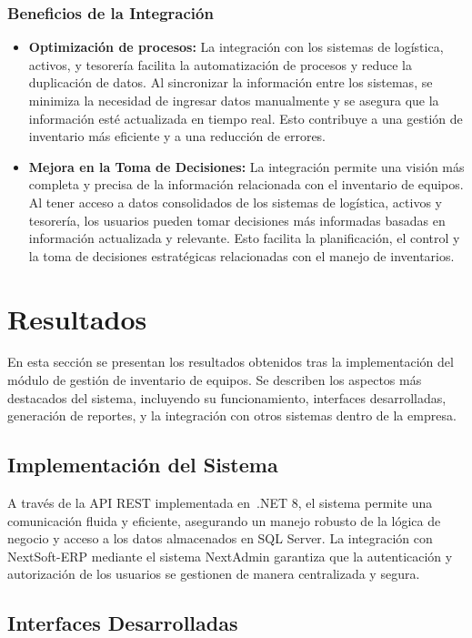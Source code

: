 \documentclass[stu, 12pt, letterpaper, donotrepeattitle, floatsintext, natbib]{apa7}
\begin{document}
\subsubsection{Beneficios de la Integración}
\begin{itemize}
    \item\textbf{Optimización de procesos: }La integración con los sistemas de logística, activos, y tesorería facilita la automatización de
          procesos y reduce la duplicación de datos. Al sincronizar la información entre los sistemas, se minimiza la necesidad de ingresar
          datos manualmente y se asegura que la información esté actualizada en tiempo real. Esto contribuye a una gestión de inventario más
          eficiente y a una reducción de errores.
    \item\textbf{Mejora en la Toma de Decisiones: }La integración permite una visión más completa y precisa de la información relacionada con
          el inventario de equipos. Al tener acceso a datos consolidados de los sistemas de logística, activos y tesorería, los usuarios pueden
          tomar decisiones más informadas basadas en información actualizada y relevante. Esto facilita la planificación, el control y la toma
          de decisiones estratégicas relacionadas con el manejo de inventarios.
\end{itemize}
\newpage
\section{Resultados}
En esta sección se presentan los resultados obtenidos tras la implementación del módulo de gestión de inventario de equipos. Se describen los
aspectos más destacados del sistema, incluyendo su funcionamiento, interfaces desarrolladas, generación de reportes, y la integración con otros
sistemas dentro de la empresa.
\subsection{Implementación del Sistema}
A través de la API REST implementada en~.NET 8, el sistema permite una comunicación fluida y eficiente, asegurando un manejo robusto de la
lógica de negocio y acceso a los datos almacenados en SQL Server. La integración con NextSoft-ERP mediante el sistema NextAdmin garantiza que
la autenticación y autorización de los usuarios se gestionen de manera centralizada y segura.
\subsection{Interfaces Desarrolladas}
\end{document}
